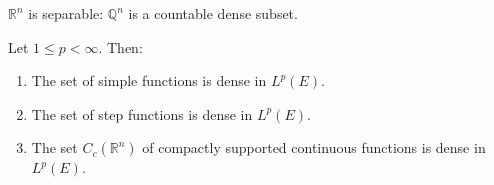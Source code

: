 \documentclass[11pt]{report}
\begin{document}
\begin{exbox}
$\mathbb{R}^n$ is separable: $\mathbb{Q}^n$ is a countable dense subset.
\end{exbox}

\begin{thmbox}[Density in $L^p$]
Let $1 \leq p < \infty$. Then:
\begin{enumerate}[label=(\roman*)]
\item The set of simple functions is dense in $L^p(E)$.
\item The set of step functions is dense in $L^p(E)$.
\item The set $C_c(\mathbb{R}^n)$ of compactly supported continuous functions is dense in $L^p(E)$.
\end{enumerate}
\end{thmbox}
\end{document}
